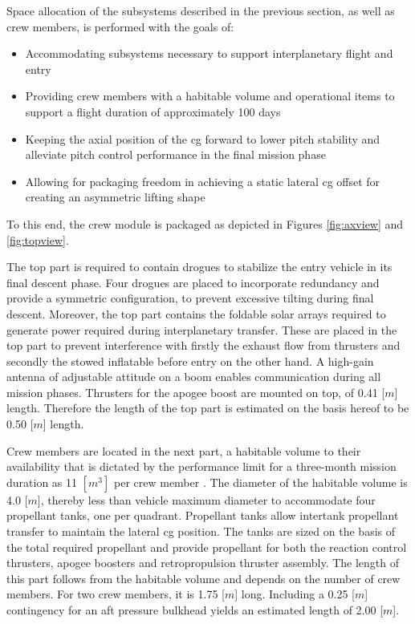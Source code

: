 Space allocation of the subsystems described in the previous section, as well as crew members, is performed with the goals of:
\begin{itemize}
\item Accommodating subsystems necessary to support interplanetary flight and entry
\item Providing crew members with a habitable volume and operational items to support a flight duration of approximately 100 days
\item Keeping the axial position of the \gls{cg} forward to lower pitch stability and alleviate pitch control performance in the final mission phase
\item Allowing for packaging freedom in achieving a static lateral \gls{cg} offset for creating an asymmetric lifting shape
\end{itemize}
To this end, the crew module is packaged as depicted in Figures \ref{fig:axview} and \ref{fig:topview}. 

The top part is required to contain drogues to stabilize the entry vehicle in its final descent phase. Four drogues are placed to incorporate redundancy and provide
a symmetric configuration, to prevent excessive tilting during final descent. Moreover, the top part contains the foldable solar arrays required to generate power required during interplanetary transfer. These are placed in the top part to prevent interference with firstly the exhaust flow from thrusters and secondly the stowed inflatable before entry on the other hand. A high-gain antenna of adjustable attitude on a boom enables communication during all mission phases. Thrusters for the apogee boost are mounted on top, of 0.41 [$m$] length. Therefore the length of the top part is estimated on the basis hereof to be 0.50 [$m$] length.

Crew members are located in the next part, a habitable volume to their availability that is dictated by the performance limit for a three-month mission duration as 11 $[m^{3}]$ per crew member \cite{Rudisill2008}. The diameter of the habitable volume is 4.0 [$m$], thereby less than vehicle maximum diameter to accommodate four propellant tanks, one per quadrant. Propellant tanks allow intertank propellant transfer to maintain the lateral \gls{cg} position. The tanks are sized on the basis of the total required propellant and provide propellant for both the reaction control thrusters, apogee boosters and retropropulsion thruster assembly. The length of this part follows from the habitable volume and depends on the number of crew members. For two crew members, it is 1.75 [$m$] long. Including a 0.25 [$m$] contingency for an aft pressure bulkhead yields an estimated length of 2.00 [$m$].

